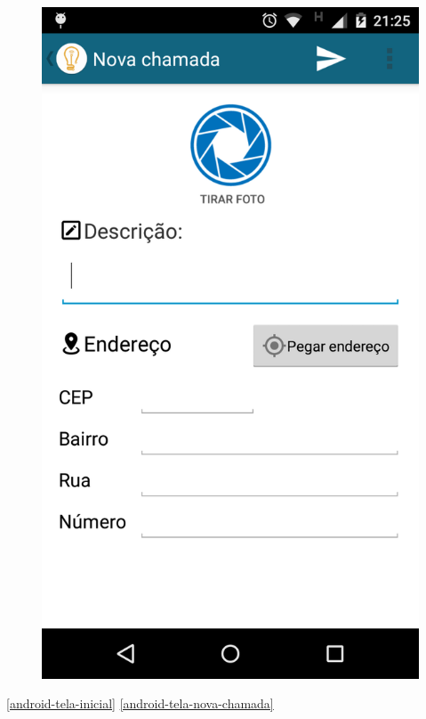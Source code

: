\documentclass[
	article,			%
	11pt,				%
	oneside,			%
	a4paper,			%
	english,			%
	brazil,				%
	sumario=tradicional
	]{abntex2}
\begin{document}
\begin{figure}[!htbp]
\begin{minipage}{0.4\textwidth}
    \includegraphics[scale=0.1]{android/2.png}
  \end{minipage}
\end{figure}

\ref{android-tela-inicial} \ref{android-tela-nova-chamada}
\end{document}
